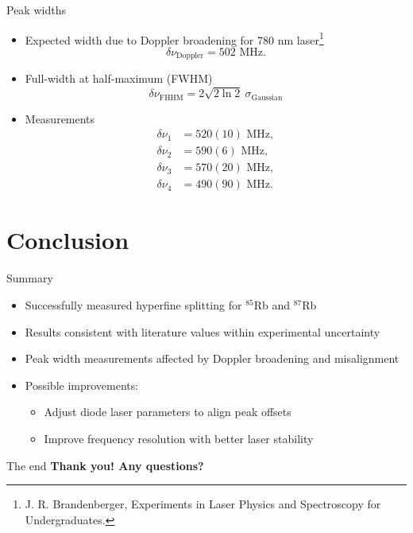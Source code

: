\documentclass{../talk}
\begin{document}
\begin{frame}{Peak widths}
  \begin{itemize}
    \item Expected width due to Doppler broadening for 780 nm laser\footnote{J. R. Brandenberger, Experiments in Laser Physics and
    Spectroscopy for Undergraduates.}
      \begin{equation}
        \delta\nu_\text{Doppler} = 502 \text{ MHz}.
      \end{equation}
    \item<2-> Full-width at half-maximum (FWHM)
      \begin{equation}
        \delta\nu_\text{FHHM} = 2 \sqrt{2 \ln 2} \ \sigma_\text{Gaussian}
      \end{equation}
    \item<3-> Measurements
      \begin{align}
        \delta\nu_1 &= 520(10) \text{ MHz}, \\
        \delta\nu_2 &= 590(6) \text{ MHz}, \\
        \delta\nu_3 &= 570(20) \text{ MHz}, \\
        \delta\nu_4 &= 490(90) \text{ MHz}.
      \end{align}
  \end{itemize}
\end{frame}

\section{Conclusion}

\begin{frame}{Summary}
  \begin{itemize}
    \item Successfully measured hyperfine splitting for $^{85}$Rb and $^{87}$Rb
    \item Results consistent with literature values within experimental uncertainty
    \item Peak width measurements affected by Doppler broadening and misalignment
    \item Possible improvements:
      \begin{itemize}
        \item Adjust diode laser parameters to align peak offsets
        \item Improve frequency resolution with better laser stability
      \end{itemize}
\end{itemize}

\end{frame}

\begin{frame}{The end}
  \textbf{\Large Thank you! Any questions?}
  
  \hrulefill
\end{frame}
\end{document}
